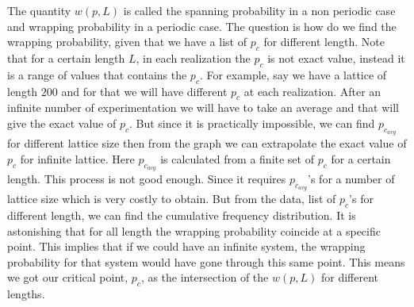 	The quantity $w(p, L)$ is called the spanning probability in a non periodic case and wrapping probability in a periodic case.
	The question is how do we find the wrapping probability, given that we have a list of $p_c$ for different length. Note that for a certain length $L$, in each realization the $p_c$ is not exact value, instead it is a range of values that contains the $p_c$. For example, say we have a lattice of length $200$ and for that we will have different $p_c$ at each realization. After an infinite number of experimentation we will have to take an average and that will give the exact value of $p_c$. But since it is practically impossible, we can find $p_{c_{avg}}$ for different lattice size then from the graph we can extrapolate the exact value of $p_c$ for infinite lattice. Here $p_{c_{avg}}$ is calculated from a finite set of $p_c$ for a certain length. This process is not good enough. Since it requires  $p_{c_{avg}}$'s for a number of lattice size which is very costly to obtain. But from the data, list of $p_c$'s for different length, we can find the cumulative frequency distribution. It is astonishing  that for all length the wrapping probability coincide at a specific point. This implies that if we could have an infinite system, the wrapping probability for that system would have gone through this same point. This means we got our critical point, $p_c$, as the intersection of the $w(p,L)$ for different lengths.
